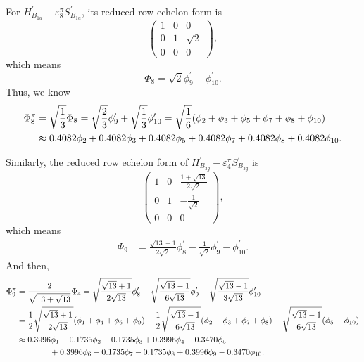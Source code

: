 \documentclass[a4paper]{book}
\newcommand{\Hp}{H^\prime}
\newcommand{\Sp}{S^\prime}
\begin{document}
\begin{solution}
\begin{enumerate}[label=(\alph*)]
		For $\Hp_{B_{1u}}-\varepsilon^\pi_8 \Sp_{B_{1u}}$, its reduced row echelon form is
		\begin{equation*}
			\begin{pmatrix}
				1	& 0	&	0	\\	0	&	1	&	\sqrt{2}	\\	0	&	0	&	0
			\end{pmatrix},
		\end{equation*}
		which means
		\begin{equation*}
			\Phi_8 = \sqrt{2}\phi^\prime_9 - \phi^\prime_{10}.
		\end{equation*}
		Thus, we know
		\begin{align}
			\Phi^\pi_8 &= \sqrt{\frac{1}{3}}\Phi_8 = \sqrt{\frac{2}{3}} \phi^\prime_9 + \sqrt{\frac{1}{3}} \phi^\prime_{10} = \sqrt{\frac{1}{6}} (\phi_2 + \phi_3 + \phi_5 + \phi_7 + \phi_8 + \phi_{10})  \notag \\
			&\approx 0.4082 \phi_2 + 0.4082 \phi_3 + 0.4082 \phi_5 +  0.4082\phi_7 + 0.4082 \phi_8 + 0.4082 \phi_{10}.
		\end{align}
		
		Similarly, the reduced row echelon form of $\Hp_{B_{3g}}-\varepsilon^\pi_4 \Sp_{B_{3g}}$ is
		\begin{equation*}
			\begin{pmatrix}
				1	& 0	&	\frac{1+\sqrt{13}}{2\sqrt{2}}	\\	0	&	1	&	-\frac{1}{\sqrt{2}}	\\	0	&	0	&	0
			\end{pmatrix},
		\end{equation*}		
		which means
		\begin{align*}
			\Phi_9 &= \frac{\sqrt{13}+1}{2\sqrt{2}}\phi^\prime_8 - \frac{1}{\sqrt{2}} \phi^\prime_9 - \phi^\prime_{10}.
		\end{align*}
		And then,
		\begin{align}
			\Phi^\pi_9 &= \frac{2}{\sqrt{13+\sqrt{13}}} \Phi_4 = \sqrt{\frac{\sqrt{13}+1}{2\sqrt{13}}} \phi^\prime_8 - \sqrt{\frac{\sqrt{13}-1}{6\sqrt{13}}} \phi^\prime_9	- \sqrt{\frac{\sqrt{13}-1}{3\sqrt{13}}} \phi^\prime_{10}\notag \\
			&= \frac{1}{2}\sqrt{\frac{\sqrt{13}+1}{2\sqrt{13}}}(\phi_1 + \phi_4 + \phi_6 + \phi_9) - \frac{1}{2}\sqrt{\frac{\sqrt{13}-1}{6\sqrt{13}}} (\phi_2 + \phi_3 + \phi_7 + \phi_8) - \sqrt{\frac{\sqrt{13}-1}{6\sqrt{13}}} (\phi_5 +\phi_{10})  \notag \\
			&\approx 0.3996 \phi_1 - 0.1735 \phi_2 -0.1735 \phi_3 +0.3996 \phi_4 -0.3470 \phi_5 \notag \\
			&\hspace*{4em} + 0.3996\phi_6 -0.1735 \phi_7 - 0.1735 \phi_8 + 0.3996 \phi_9 - 0.3470 \phi_{10}.
		\end{align}
		

\end{enumerate}
\end{solution}
\end{document}
